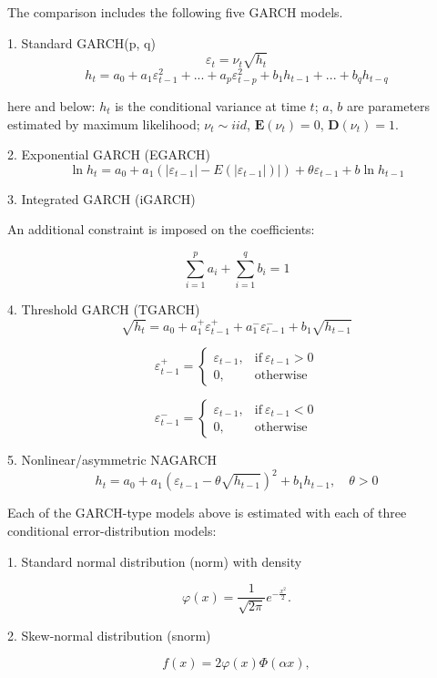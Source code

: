 \documentclass[]{article}
\begin{document}
The comparison includes the following five GARCH models.

1. Standard GARCH(p, q)
$$\varepsilon_t = \nu_t \sqrt{h_t}$$
$$h_t = a_0 + a_1\varepsilon_{t-1}^2 + ... + a_p\varepsilon_{t-p}^2 + b_1 h_{t-1} + ... + b_q h_{t-q}$$

here and below: $h_t$ is the conditional variance at time $t$; $a$, $b$ are parameters estimated by maximum likelihood; $\nu_t \sim iid$, $\mathbf{E}(\nu_t) = 0$, $\mathbf{D}(\nu_t) = 1$.

2. Exponential GARCH (EGARCH)
$$\ln{h_t} = a_0 + a_1(|\varepsilon_{t-1}| - E(|\varepsilon_{t-1}|)|) + \theta\varepsilon_{t-1} + b\ln{h_{t-1}}$$

3. Integrated GARCH (iGARCH)

An additional constraint is imposed on the coefficients:

$$\sum_{i=1}^{p} a_i + \sum_{i=1}^{q} b_i = 1$$

4. Threshold GARCH (TGARCH)
$$\sqrt{h_t} = a_0 + a_1^{+}\varepsilon_{t-1}^{+} + a_1^{-}\varepsilon_{t-1}^{-} + b_1\sqrt{h_{t-1}}$$

$$
	\varepsilon_{t-1}^{+} =
	\begin{cases}
		\varepsilon_{t-1}, & \text{if} \ \varepsilon_{t-1} > 0 \\
		0, & \text{otherwise}
	\end{cases}
$$

$$
	\varepsilon_{t-1}^{-} =
	\begin{cases}
		\varepsilon_{t-1}, & \text{if} \ \varepsilon_{t-1} < 0 \\
		0, & \text{otherwise}
	\end{cases}
$$

5. Nonlinear/asymmetric NAGARCH
$$h_t = a_0 + a_1(\varepsilon_{t-1} - \theta\sqrt{h_{t-1}})^2 + b_1 h_{t-1}, \quad \theta > 0$$


Each of the GARCH-type models above is estimated with each of three conditional error-distribution models:

1. Standard normal distribution (norm) with density

\begin{equation}
	\varphi(x) = \frac{1}{\sqrt{2\pi}} e^{-\frac{x^2}{2}}.
\end{equation}

2. Skew-normal distribution (snorm)

\begin{equation}
	f(x) = 2\varphi(x)\Phi(\alpha x),
\end{equation}
\end{document}
